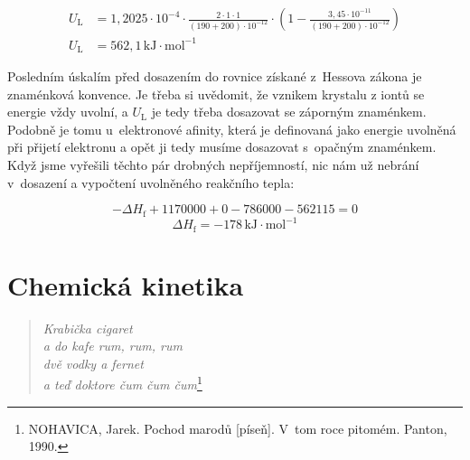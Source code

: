 \documentclass{book}
\begin{document}
\begin{align*}
U_{\mathrm{L}} & =1,2025\cdot10^{-4}\cdot\frac{2\cdot1\cdot1}{(190+200)\cdot10^{-12}}\cdot\left(1-\frac{3,45\cdot10^{-11}}{(190+200)\cdot10^{-12}}\right)\\
U_{\mathrm{L}} & =562,1\,\mathrm{kJ\cdot mol^{-1}}
\end{align*}

Posledním úskalím před dosazením do rovnice získané z~Hessova zákona
je znaménková konvence. Je třeba si uvědomit, že vznikem krystalu
z iontů se energie vždy uvolní, a $U_{\mathrm{L}}$ je tedy třeba dosazovat se záporným znaménkem. Podobně je tomu u~elektronové afinity, která je definovaná
jako energie uvolněná při přijetí elektronu a opět ji tedy musíme
dosazovat s~opačným znaménkem. Když jsme vyřešili těchto pár drobných
nepříjemností, nic nám už nebrání v~dosazení a vypočtení uvolněného
reakčního tepla: 

\[
-\Delta H_{\mathrm{f}}+1170000+0-786000-562115=0
\]
\[
\Delta H_{\mathrm{f}}=-178\,\mathrm{kJ\cdot mol^{-1}}
\]


\section{Chemická kinetika}

\begin{verse}
\textit{Krabička cigaret }\\
\textit{a do kafe rum, rum, rum }\\
\textit{dvě vodky a fernet }\\
\textit{a teď doktore čum čum čum}\footnote{NOHAVICA, Jarek. Pochod marodů {[}píseň{]}. V~tom roce pitomém. Panton,
1990.}
\end{verse}
\end{document}
